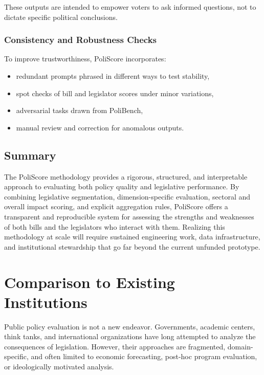\documentclass[12pt]{article}
\begin{document}
These outputs are intended to empower voters to ask informed questions, not to dictate specific political conclusions.

\subsubsection{Consistency and Robustness Checks}

To improve trustworthiness, PoliScore incorporates:

\begin{itemize}
    \item redundant prompts phrased in different ways to test stability,
    \item spot checks of bill and legislator scores under minor variations,
    \item adversarial tasks drawn from PoliBench,
    \item manual review and correction for anomalous outputs.
\end{itemize}

\subsection*{Summary}

The PoliScore methodology provides a rigorous, structured, and interpretable approach to evaluating both policy quality
and legislative performance. By combining legislative segmentation, dimension-specific evaluation, sectoral and overall
impact scoring, and explicit aggregation rules, PoliScore offers a transparent and reproducible system for assessing the
strengths and weaknesses of both bills and the legislators who interact with them. Realizing this methodology at scale
will require sustained engineering work, data infrastructure, and institutional stewardship that go far beyond the current
unfunded prototype.


\section{Comparison to Existing Institutions}
\label{sec:comparison}

Public policy evaluation is not a new endeavor. Governments, academic centers, think tanks, and international organizations
have long attempted to analyze the consequences of legislation. However, their approaches are fragmented, domain-specific,
and often limited to economic forecasting, post-hoc program evaluation, or ideologically motivated analysis.
\end{document}
